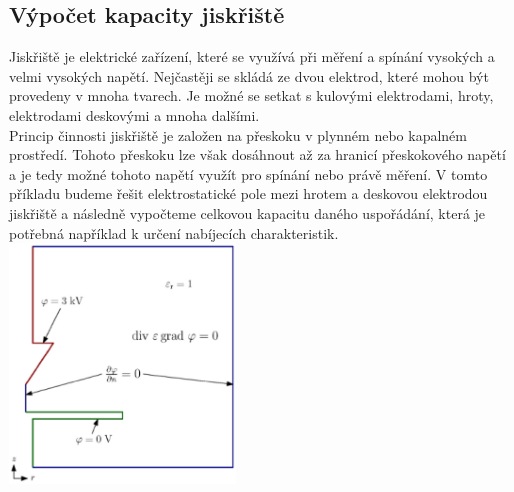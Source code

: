 \documentclass[a4paper, oneside]{article}
\begin{document}
\subsection{Výpočet kapacity jiskřiště}
Jiskřiště je elektrické zařízení, které se využívá při měření a spínání vysokých a velmi vysokých napětí. Nejčastěji se skládá ze dvou elektrod, které mohou být provedeny v mnoha tvarech. Je možné se setkat s kulovými elektrodami, hroty, elektrodami deskovými a mnoha dalšími.\\
Princip činnosti jiskřiště je založen na přeskoku v plynném nebo kapalném prostředí. Tohoto přeskoku lze však dosáhnout až za hranicí přeskokového napětí a je tedy možné tohoto napětí využít pro spínání nebo právě měření. V tomto příkladu budeme řešit elektrostatické pole mezi hrotem a deskovou elektrodou jiskřiště a následně vypočteme celkovou kapacitu daného uspořádání, která je potřebná například k určení nabíjecích charakteristik.\\
\includegraphics[width=6cm]{Matematicky_model_jiskriste.eps}\\
\end{document}
